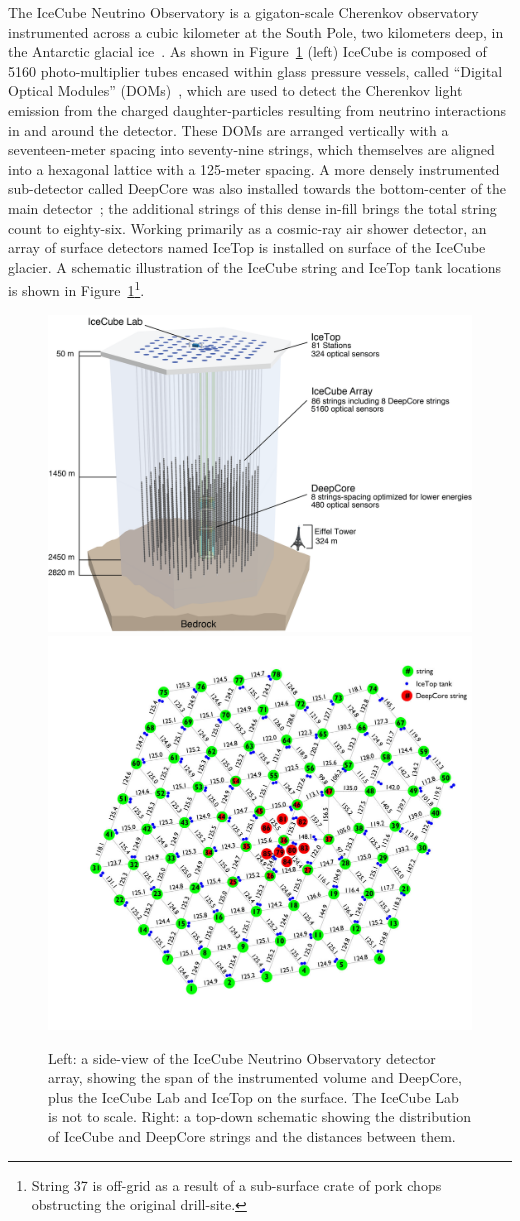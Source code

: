 \documentclass[main.tex]{subfiles}
\begin{document}
The IceCube Neutrino Observatory is a gigaton-scale Cherenkov observatory instrumented across a cubic kilometer at the South Pole, two kilometers deep, in the Antarctic glacial ice~\cite{Aartsen_2017}.
As shown in Figure~\ref{fig:icecube_figs} (left) IceCube is composed of 5160 photo-multiplier tubes encased within glass pressure vessels, called ``Digital Optical Modules'' (DOMs)~\cite{ABBASI2009294}, which are used to detect the Cherenkov light emission from the charged daughter-particles resulting from neutrino interactions in and around the detector.
These DOMs are arranged vertically with a seventeen-meter spacing into seventy-nine strings, which themselves are aligned into a hexagonal lattice with a 125-meter spacing. 
A more densely instrumented sub-detector called DeepCore was also installed towards the bottom-center of the main detector~\cite{ABBASI2012615}; the additional strings of this dense in-fill brings the total string count to eighty-six.
Working primarily as a cosmic-ray air shower detector, an array of surface detectors named IceTop is installed on surface of the IceCube glacier.
A schematic illustration of the IceCube string and IceTop tank locations is shown in Figure~\ref{fig:icecube_figs}\footnote{String 37 is off-grid as a result of a sub-surface crate of pork chops obstructing the original drill-site.}.

\begin{figure}
    \centering
    \includegraphics[width=0.5\linewidth]{figures/IceCubeArray.png}
    \includegraphics[width=0.4\linewidth]{figures/VetoView2_distance_123012.jpg}
    \caption{Left: a side-view of the IceCube Neutrino Observatory detector array, showing the span of the instrumented volume and DeepCore, plus the IceCube Lab and IceTop on the surface. The IceCube Lab is not to scale. Right: a top-down schematic showing the distribution of IceCube and DeepCore strings and the distances between them.}\label{fig:icecube_figs}
\end{figure}
\end{document}
